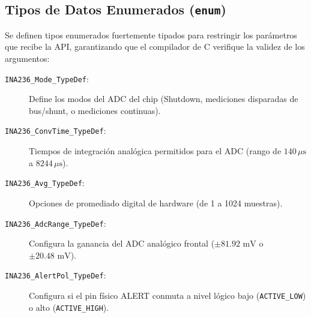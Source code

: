 \documentclass[
10pt, %
a4paper, %
oneside, %
headinclude,footinclude, %
BCOR5mm, %
]{scrartcl}
\begin{document}
\subsection{Tipos de Datos Enumerados (\texttt{enum})}
Se definen tipos enumerados fuertemente tipados para restringir los parámetros que recibe la API, garantizando que el compilador de C verifique la validez de los argumentos:
\begin{description}
	\item[\texttt{INA236\_Mode\_TypeDef}:] Define los modos del ADC del chip (Shutdown, mediciones disparadas de bus/shunt, o mediciones continuas).
	\item[\texttt{INA236\_ConvTime\_TypeDef}:] Tiempos de integración analógica permitidos para el ADC (rango de $140\,\mu\text{s}$ a $8244\,\mu\text{s}$).
	\item[\texttt{INA236\_Avg\_TypeDef}:] Opciones de promediado digital de hardware (de 1 a 1024 muestras).
	\item[\texttt{INA236\_AdcRange\_TypeDef}:] Configura la ganancia del ADC analógico frontal ($\pm 81.92\text{ mV}$ o $\pm 20.48\text{ mV}$).
	\item[\texttt{INA236\_AlertPol\_TypeDef}:] Configura si el pin físico ALERT conmuta a nivel lógico bajo (\texttt{ACTIVE\_LOW}) o alto (\texttt{ACTIVE\_HIGH}).
\end{description}
\end{document}

